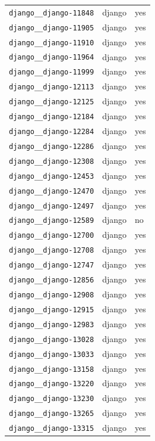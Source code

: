 \begin{longtable}{@{}p{}lp{}@{}}
\texttt{django\_\_django-11848} & django & yes \\
\texttt{django\_\_django-11905} & django & yes \\
\texttt{django\_\_django-11910} & django & yes \\
\texttt{django\_\_django-11964} & django & yes \\
\texttt{django\_\_django-11999} & django & yes \\
\texttt{django\_\_django-12113} & django & yes \\
\texttt{django\_\_django-12125} & django & yes \\
\texttt{django\_\_django-12184} & django & yes \\
\texttt{django\_\_django-12284} & django & yes \\
\texttt{django\_\_django-12286} & django & yes \\
\texttt{django\_\_django-12308} & django & yes \\
\texttt{django\_\_django-12453} & django & yes \\
\texttt{django\_\_django-12470} & django & yes \\
\texttt{django\_\_django-12497} & django & yes \\
\texttt{django\_\_django-12589} & django & no \\
\texttt{django\_\_django-12700} & django & yes \\
\texttt{django\_\_django-12708} & django & yes \\
\texttt{django\_\_django-12747} & django & yes \\
\texttt{django\_\_django-12856} & django & yes \\
\texttt{django\_\_django-12908} & django & yes \\
\texttt{django\_\_django-12915} & django & yes \\
\texttt{django\_\_django-12983} & django & yes \\
\texttt{django\_\_django-13028} & django & yes \\
\texttt{django\_\_django-13033} & django & yes \\
\texttt{django\_\_django-13158} & django & yes \\
\texttt{django\_\_django-13220} & django & yes \\
\texttt{django\_\_django-13230} & django & yes \\
\texttt{django\_\_django-13265} & django & yes \\
\texttt{django\_\_django-13315} & django & yes \\

\end{longtable}
